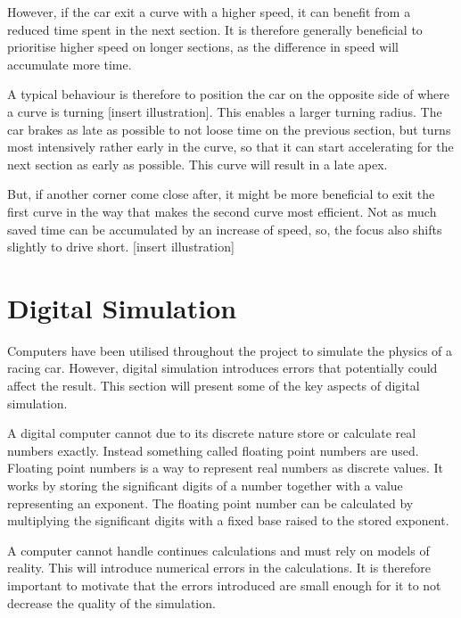 However, if the car exit a curve with a higher speed, it can benefit from a reduced time spent in the next section. It is therefore generally beneficial to prioritise higher speed on longer sections\cite{beckman:racing_line_intro}, as the difference in speed will accumulate more time.

A typical behaviour is therefore to position the car on the opposite side of where a curve is turning [insert illustration]. This enables a larger turning radius. The car brakes as late as possible to not loose time on the previous section, but turns most intensively rather early in the curve, so that it can start accelerating for the next section as early as possible. This curve will result in a late apex.

But, if another corner come close after, it might be more beneficial to exit the first curve in the way that makes the second curve most efficient. Not as much saved time can be accumulated by an increase of speed, so, the focus also shifts slightly to drive short. [insert illustration]

\section{Digital Simulation}


Computers have been utilised throughout the project to simulate the physics of a racing car. However, digital simulation introduces errors that potentially could affect the result. This section will present some of the key aspects of digital simulation. 

A digital computer cannot due to its discrete nature store or calculate real numbers exactly. Instead something called floating point numbers are used. Floating point numbers is a way to represent real numbers as discrete values. It works by storing the significant digits of a number together with a value representing an exponent. The floating point number can be calculated by multiplying the significant digits with a fixed base raised to the stored exponent.

A computer cannot handle continues calculations and must rely on models of reality. This will introduce numerical errors in the calculations. It is therefore important to motivate that the errors introduced are small enough for it to not decrease the quality of the simulation.

